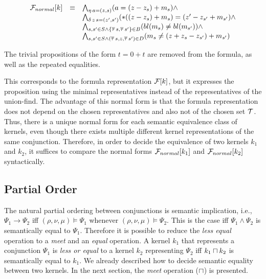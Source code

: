 \[
    \begin{array}{lll}
        \mathcal{F}_{normal}[k] & \equiv & \bigwedge_{\eta\,a=(z,s)} (a = (z - z_s) + m_s) \land                                                           \\
                         &        & \bigwedge_{\delta\,z\,s=(z',s')} (*((z-z_s) + m_s) = (z'-z_{s'} + m_{s'}) \land                                 \\
                         &        & \bigwedge_{s,s' \in S \land \{\overline{\tau}\,s, \overline{\tau}\,s'\} \in B} (bl(m_{s}) \neq bl(m_{s'})) \land           \\
                         &        & \bigwedge_{s,s' \in S \land (\overline{\tau}\,s, z,\overline{\tau}\,s') \in D} (m_{s} \neq (z+ z_{s} -z_{s'}) + m_{s'})
    \end{array}
\]

The trivial propositions of the form $t = 0 + t$ are removed from the formula, as well as the repeated equalities.

This corresponds to the formula representation $\mathcal{F}[k]$, but it expresses the proposition using the minimal representatives instead of the representatives of the union-find.
The advantage of this normal form is that the formula representation does not depend on the chosen representatives and also not of the chosen set $\mathcal{T}$.
Thus, there is a unique normal form for each semantic equivalence class of kernels,
even though there exists multiple different kernel representations of the same conjunction.
Therefore, in order to decide the equivalence of two kernels $k_1$ and $k_2$, it suffices to compare the normal forms $\mathcal{F}_{normal}[k_1]$ and $\mathcal{F}_{normal}[k_2]$ syntactically.



\subsection{Partial Order}

The natural partial ordering between conjunctions is semantic implication, i.e.,
$\Psi_1 \rightarrow \Psi_2$
iff $(\rho, \nu, \mu) \models \Psi_1$ whenever $(\rho, \nu, \mu) \models \Psi_2$.
This is the case iff $\Psi_1 \land \Psi_2$ is semantically equal to $\Psi_1$.
Therefore it is possible to reduce the \emph{less equal} operation to a \emph{meet} and an \emph{equal} operation.
A kernel $k_1$ that represents a conjunction $\Psi_1$ is \emph{less or equal} to a kernel $k_2$ representing $\Psi_2$ iff
$k_1 \sqcap k_2$ is semantically equal to $k_1$.
We already described how to decide semantic equality between two kernels.
In the next section, the \emph{meet} operation ($\sqcap$) is presented.
